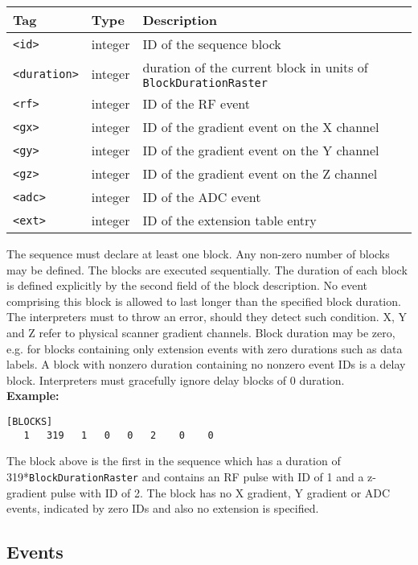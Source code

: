 \documentclass{article}
\begin{document}
\begin{tabularx}{\textwidth}{llX}
\toprule
Tag & Type & Description\\
\midrule
\verb.<id>. & integer & ID of the sequence block \\
\verb.<duration>. & integer & duration of the current block in units of \verb.BlockDurationRaster. \\
\verb.<rf>. & integer & ID of the RF event \\
\verb.<gx>. & integer & ID of the gradient event on the X channel \\
\verb.<gy>. & integer & ID of the gradient event on the Y channel \\
\verb.<gz>. & integer & ID of the gradient event on the Z channel \\
\verb.<adc>. & integer & ID of the ADC event \\
\verb.<ext>. & integer & ID of the extension table entry \\
\bottomrule
\end{tabularx}

\begin{minipage}{\textwidth}
The sequence must declare at least one block. Any non-zero number of blocks may be defined. The blocks are executed sequentially. The duration of each block is defined explicitly by the second field of the block description. No event comprising this block is allowed to last longer than the specified block duration. The interpreters must to throw an error, should they detect such condition. X, Y and Z refer to physical scanner gradient channels. Block duration may be zero, e.g. for blocks containing only extension events with zero durations such as data labels. A block with nonzero duration containing no nonzero event IDs is a delay block. Interpreters must gracefully ignore delay blocks of 0 duration. \\

\textbf{Example:}
\begin{lstlisting}
[BLOCKS]
   1   319   1   0   0   2    0    0
\end{lstlisting}
\end{minipage}

The block above is the first in the sequence which has a duration of 319*\verb.BlockDurationRaster. and contains an RF pulse with ID of 1 and a z-gradient pulse with ID of 2. The block has no X gradient, Y gradient or ADC events, indicated by zero IDs and also no extension is specified.

\subsection{Events}
\end{document}
